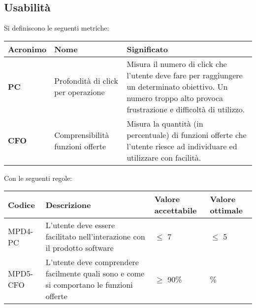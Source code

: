 \subsection{Usabilità}
\par Si definiscono le seguenti metriche:
\begin{table}[h!]
\centering
\def\arraystretch{1.5}
\begin{tabular}{ |m{2cm}|m{5.5cm}|m{6.5cm}| }
\hline
\rowcolor{lightgray!30}
\textbf{Acronimo} & \textbf{Nome} & \textbf{Significato}\\
\hline
\textbf{PC} & Profondità di click per operazione & Misura il numero di click che l'utente deve fare per raggiungere un determinato obiettivo. Un numero troppo alto provoca frustrazione e difficoltà di utilizzo.\\
\hline
\textbf{CFO} & Comprensibilità funzioni offerte & Misura la quantità (in percentuale) di funzioni offerte che l'utente riesce ad individuare ed utilizzare con facilità.\\
\hline
\end{tabular}
\end{table}
\newpage
\par Con le seguenti regole:
\begin{table}[h!]
\centering
\def\arraystretch{1.5}
\begin{tabular}{ |>{\centering\arraybackslash}m{2.5cm}|>{\centering\arraybackslash}m{5.5cm}|>{\centering\arraybackslash}m{3cm}|>{\centering\arraybackslash}m{3cm}| }
\hline
\rowcolor{black}
\textbf{\color{white} Codice} & \textbf{\color{white} Descrizione} & \textbf{\color{white} Valore accettabile} & \textbf{\color{white} Valore ottimale}\\
\hline
MPD4-PC & L'utente deve essere facilitato nell'interazione con il prodotto software & $\leq$ 7 & $\leq$ 5 \\
\hline
MPD5-CFO & L'utente deve comprendere facilmente quali sono e come si comportano le funzioni offerte & $\geq$ 90\% & 100\% \\
\hline
\end{tabular}
\end{table}

